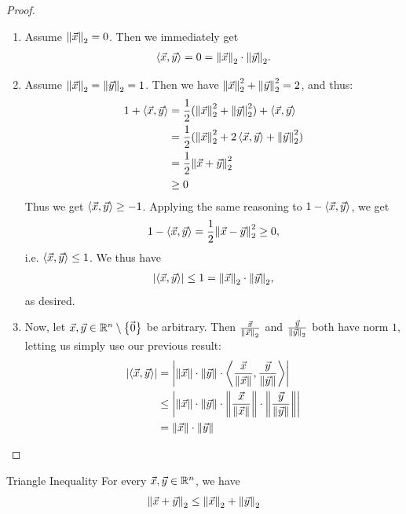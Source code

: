 \begin{proof}
	\begin{enumerate}
		\item Assume $\norm{\vec{x}}_2 = 0$. Then we immediately get 
		\begin{align*}
			\left\langle \vec{x}, \vec{y} \right\rangle = 0 = \norm{\vec{x}}_2 \cdot \norm{\vec{y}}_2.
		\end{align*}
		\item Assume $\norm{\vec{x}}_2 = \norm{\vec{y}}_2 = 1$. Then we have $\norm{\vec{x}}_2^2 + \norm{\vec{y}}_2^2 = 2$, and thus:
		\begin{align*}
			1 + \left\langle \vec{x}, \vec{y} \right\rangle
			&= \frac{1}{2} (\norm{\vec{x}}_2^2 + \norm{\vec{y}}_2^2) + \left\langle \vec{x}, \vec{y} \right\rangle\\
			&= \frac{1}{2} (\norm{\vec{x}}_2^2 + 2\left\langle \vec{x}, \vec{y} \right\rangle + \norm{\vec{y}}_2^2)\\
			&= \frac{1}{2} \norm{\vec{x} + \vec{y}}_2^2\\
			&\geq 0
		\end{align*}
		Thus we get $\left\langle \vec{x}, \vec{y} \right\rangle \geq -1$. Applying the same reasoning to $1 - \left\langle \vec{x}, \vec{y} \right\rangle$, we get 
		\begin{align*}
			1 - \left\langle \vec{x}, \vec{y} \right\rangle = \frac{1}{2} \norm{\vec{x} - \vec{y}}_2^2 \geq 0,
		\end{align*}
		i.e. $\left\langle \vec{x}, \vec{y} \right\rangle \leq 1$. We thus have 
		\begin{align*}
			\abs{\left\langle \vec{x}, \vec{y} \right\rangle} \leq 1 = \norm{\vec{x}}_2 \cdot \norm{\vec{y}}_2,
 		\end{align*}
	 	as desired.
	 	\item Now, let $\vec{x}, \vec{y} \in \mathbb{R}^n \setminus \qty{\kern-1.2pt\vec{\kern1.2pt 0}}$ be arbitrary. Then $\frac{\vec{x}}{\norm{\vec{x}}_2}$ and $\frac{\vec{y}}{\norm{\vec{y}}_2}$ both have norm $1$, letting us simply use our previous result:
	 	\begin{align*}
	 		\abs{\left\langle \vec{x}, \vec{y} \right\rangle}
	 		&= \abs{\norm{\vec{x}} \cdot \norm{\vec{y}} \cdot \left\langle \frac{\vec{x}}{\norm{\vec{x}}}, \frac{\vec{y}}{\norm{\vec{y}}} \right\rangle}\\
	 		&\leq \abs{\norm{\vec{x}} \cdot \norm{\vec{y}} \cdot \norm{\frac{\vec{x}}{\norm{\vec{x}}}} \cdot \norm{\frac{\vec{y}}{\norm{\vec{y}}}}}\\
	 		&= \norm{\vec{x}} \cdot \norm{\vec{y}}
	 	\end{align*}
	\end{enumerate}
\end{proof}
\begin{importantcorollary}{Triangle Inequality}{}
	For every $\vec{x}, \vec{y} \in \mathbb{R}^n$, we have
	\begin{align*}
		\norm{\vec{x} + \vec{y}}_2 \leq \norm{\vec{x}}_2 + \norm{\vec{y}}_2
	\end{align*}
\end{importantcorollary}
